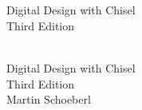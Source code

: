 \documentclass[%
    10pt,
    headinclude, footexclude,
    openright, %
    notitlepage,
    cleardoubleempty,
    headsepline,
    pointlessnumbers,
    bibtotoc, idxtotoc,
    ]{scrbook}
\newif\ifbook
\begin{document}
\ifbook
\else

\newpage
\thispagestyle{empty}
~
\newpage
\fi



\begin{flushleft}
\pagestyle{empty}
\ \\
\vspace{1cm}
{\mdseries\huge Digital Design with Chisel}
\ \\
\vspace{1cm}
{\mdseries\Large Third Edition}
\cleardoublepage
\end{flushleft}
\newpage


\begin{flushleft}
\pagestyle{empty}
\ \\
\vspace{1cm}
{\Huge Digital Design with Chisel\\
\bigskip
{\huge Third Edition}\\
\bigskip
\bigskip
\bigskip
\bigskip
\bigskip
{\huge Martin Schoeberl}
\medskip\\

}

\newpage
\end{flushleft}
\end{document}
